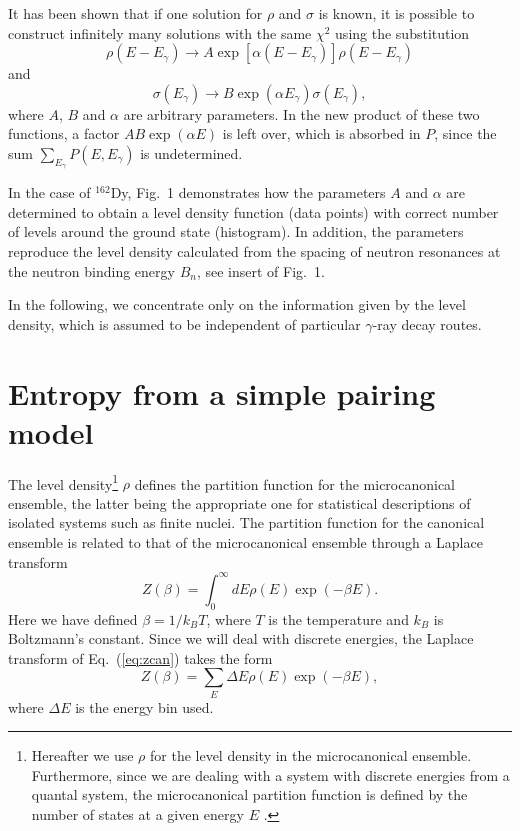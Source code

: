 It has been shown \cite{17} that if one solution for $\rho$ and $\sigma$ is known, it is possible to construct infinitely many solutions with the same $\chi ^2$ using the substitution
\begin{equation}
\rho (E -E_{\gamma}) \rightarrow A \exp [\alpha(E-E_{\gamma})] \rho (E -E_{\gamma})
\end{equation}
and
\begin{equation}
\sigma (E_{\gamma}) \rightarrow B\exp (\alpha E_{\gamma})\sigma (E_{\gamma}),
\end{equation}
where $A$, $B$ and $\alpha$ are arbitrary parameters. In the new product of these two functions, a factor $AB\exp (\alpha E)$ is left over, which is absorbed in $P$, since the sum $\sum_{E_{\gamma}} P(E,E_{\gamma})$ is undetermined.

In the case of $^{162}$Dy, Fig.~1 demonstrates how the parameters $A$ and $\alpha $ are determined to obtain a level density function (data points) with correct number of levels around the ground state (histogram). In addition, the parameters reproduce the level density calculated from the spacing of neutron resonances at the neutron binding 
energy $B_n$, see insert of Fig.~1.

In the following, we concentrate only on the information given by the level density, which is assumed to be independent of particular $\gamma$-ray decay routes.


\section{Entropy from a simple pairing model}

The level density\footnote{Hereafter we use $\rho$ for the level density in the microcanonical ensemble. Furthermore, since we are dealing with a system with discrete 
energies from a quantal system, the microcanonical partition function is
defined by the number of states at a given energy $E$ \cite{gross99}.} $\rho$ defines the partition function for the microcanonical ensemble, the latter being the appropriate one for statistical descriptions of isolated systems such as finite nuclei. The partition function for the canonical ensemble is related to that of the microcanonical ensemble through a Laplace transform
\begin{equation}
     Z(\beta)=\int_0^{\infty}dE\rho(E)\exp{(-\beta E)}.
     \label{eq:zcan}
\end{equation}
Here we have defined $\beta=1/k_BT$, where $T$ is the temperature and $k_B$ is Boltzmann's constant. Since we will deal with discrete energies, the Laplace transform of Eq.\ (\ref{eq:zcan}) takes the form
\begin{equation}
         Z(\beta)=\sum_E \Delta E\rho(E)\exp{(-\beta E)},
         \label{eq:zactual}
\end{equation}
where $\Delta E$ is the energy bin used.

